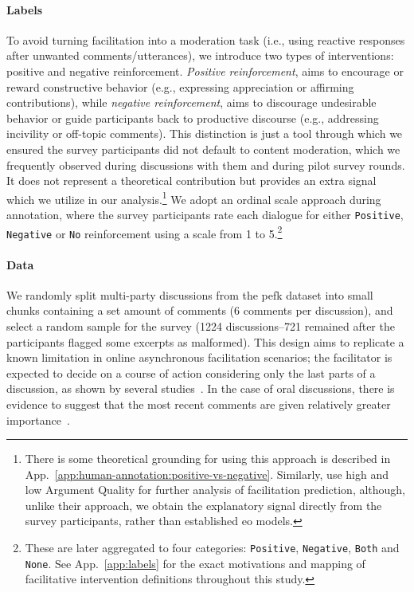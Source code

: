 \documentclass[11pt]{article}
\theoremstyle{definition}
\theoremstyle{plain}
\begin{document}
\paragraph{Labels} To avoid turning facilitation into a moderation task (i.e., using reactive responses after unwanted comments/utterances), we introduce two types of interventions: positive and negative reinforcement. \emph{Positive reinforcement}, aims to encourage or reward constructive behavior (e.g., expressing appreciation or affirming contributions), while \emph{negative reinforcement}, aims to discourage undesirable behavior or guide participants back to productive discourse (e.g., addressing incivility or off-topic comments). This distinction is just a tool through which we ensured the survey participants did not default to content moderation, which we frequently observed during discussions with them and during pilot survey rounds. It does not represent a theoretical contribution but provides an extra signal which we utilize in our analysis.\footnote{There is some theoretical grounding for using this approach is described in App.~\ref{app:human-annotation:positive-vs-negative}. Similarly, \citet{falk-etal-2021-predicting} use high and low Argument Quality for further analysis of facilitation prediction, although, unlike their approach, we obtain the explanatory signal directly from the survey participants, rather than established \ac{eo} models.} We adopt an ordinal scale approach during annotation, where the survey participants rate each dialogue for either \texttt{Positive}, \texttt{Negative} or \texttt{No} reinforcement using a scale from 1 to 5.\footnote{These are later aggregated to four categories: \texttt{Positive}, \texttt{Negative}, \texttt{Both} and \texttt{None}. See App.~\ref{app:labels} for the exact motivations and mapping of facilitative intervention definitions throughout this study.}

\paragraph{Data}
We randomly split multi-party discussions from the \ac{pefk} dataset into small chunks containing a set amount of comments (6 comments per discussion), and select a random sample for the survey (1224 discussions--721 remained after the participants flagged some excerpts as malformed). This design aims to replicate a known limitation in online asynchronous facilitation scenarios; the facilitator is expected to decide on a course of action considering only the last parts of a discussion, as shown by several studies~\citep{hewitt2003habitual, park2016supporting, kumpel2021does}. In the case of oral discussions, there is evidence to suggest that the most recent comments are given relatively greater importance~\citep{crano1977primacy, cockburn2017effects}.
\end{document}
